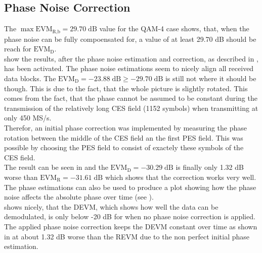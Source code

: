 \subsection{Phase Noise Correction}
\label{sec:res_450_phase}
The $\max \text{EVM}_\text{R,b} = 29.70 \;\text{dB}$ value for the
\gls{QAM}-4 case shows, that, when the phase noise can be fully compoensated
for, a value of at least 29.70 dB should be reach for $\text{EVM}_\text{D}$. \\

 show the results, after the phase noise
estimation and correction, as described in , has been
activated. The phase noise estimations seem to nicely align all received
data blocks.
The $\text{EVM}_\text{D} = -23.88 \;\text{dB} \geq -29.70 \;\text{dB}$ is still
not where it should be though. This is due to the fact, that the whole
picture is slightly rotated. This comes from the fact, that the phase cannot
be assumed to be constant during the transmission of the relatively
long \gls{CES} field (1152 symbols) when transmitting at only 450 MS/s. \\

Therefor, an initial phase correction was implemented by measuring the phase
rotation between the middle of the \gls{CES} field an the first \gls{PES}
field. This was possible by choosing the \gls{PES} field to consist
of exactely these symbols of the \gls{CES} field. \\

The result can be seen in  and the
$\text{EVM}_\text{D} = -30.29 \;\text{dB}$ is finally only 1.32 dB worse than
$\text{EVM}_\text{R} = -31.61 \;\text{dB}$ which shows that the correction
works very well. \\

The phase estimations can also be used to produce a plot showing how the
phase noise affects the absolute phase over time
(see ).
 \\

 shows nicely, that the \gls{DEVM},
which shows how well the data can be demodulated, is only below -20 dB
for  when no phase noise correction is applied.
The applied phase noise correction keeps the \gls{DEVM} constant over time
as shown in  at about 1.32 dB
worse than the \gls{REVM} due to the non perfect initial phase
estimation. \\

